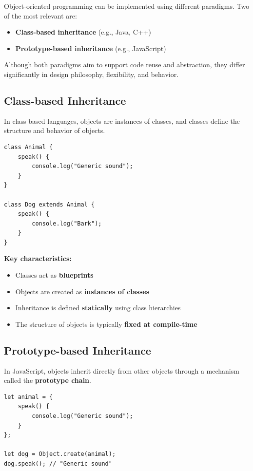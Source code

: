 \documentclass{scrbook}
\begin{document}
Object-oriented programming can be implemented using different paradigms. Two of the most relevant are:

\begin{itemize}
    \item \textbf{Class-based inheritance} (e.g., Java, C++)
    \item \textbf{Prototype-based inheritance} (e.g., JavaScript)
\end{itemize}

Although both paradigms aim to support code reuse and abstraction, they differ significantly in design philosophy, flexibility, and behavior.

\subsection{Class-based Inheritance}

In class-based languages, objects are instances of classes, and classes define the structure and behavior of objects.

\begin{lstlisting}
class Animal {
    speak() {
        console.log("Generic sound");
    }
}

class Dog extends Animal {
    speak() {
        console.log("Bark");
    }
}
\end{lstlisting}

\textbf{Key characteristics:}
\begin{itemize}
    \item Classes act as \textbf{blueprints}
    \item Objects are created as \textbf{instances of classes}
    \item Inheritance is defined \textbf{statically} using class hierarchies
    \item The structure of objects is typically \textbf{fixed at compile-time}
\end{itemize}

\subsection{Prototype-based Inheritance}

In JavaScript, objects inherit directly from other objects through a mechanism called the \textbf{prototype chain}.

\begin{lstlisting}
let animal = {
    speak() {
        console.log("Generic sound");
    }
};

let dog = Object.create(animal);
dog.speak(); // "Generic sound"
\end{lstlisting}
\end{document}
